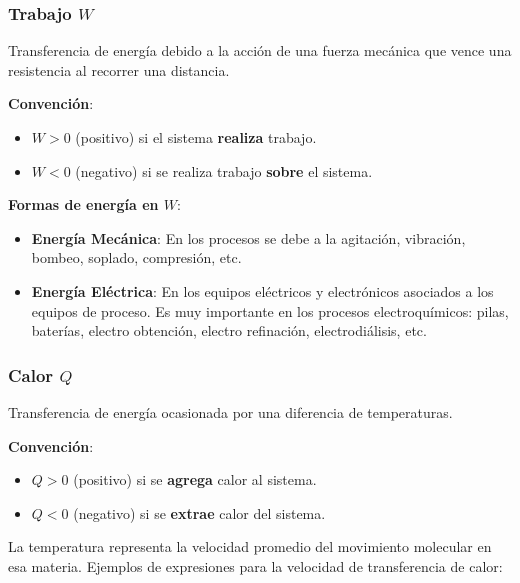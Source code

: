         \subsubsection{Trabajo \(W\)}
        
        Transferencia de energía debido a la acción de una fuerza mecánica que vence una resistencia al recorrer una distancia.
        
        \textbf{Convención}:
        
        \begin{itemize}
            \item \(W > 0\) (positivo) si el sistema \textbf{realiza} trabajo.
            \item \(W < 0\) (negativo) si se realiza trabajo \textbf{sobre} el sistema.
        \end{itemize}
        
        \textbf{Formas de energía en \(W\)}:
        
        \begin{itemize}
            \item \textbf{Energía Mecánica}: En los procesos se debe a la agitación, vibración, bombeo, soplado, compresión, etc.
            \item \textbf{Energía Eléctrica}: En los equipos eléctricos y electrónicos asociados a los equipos de proceso. Es muy importante en los procesos electroquímicos: pilas, baterías, electro obtención, electro refinación, electrodiálisis, etc.
        \end{itemize}
        
        \subsubsection{Calor \(Q\)}
        
        Transferencia de energía ocasionada por una diferencia de temperaturas.
        
        \textbf{Convención}:
        
        \begin{itemize}
            \item \(Q > 0\) (positivo) si se \textbf{agrega} calor al sistema.
            \item \(Q < 0\) (negativo) si se \textbf{extrae} calor del sistema.
        \end{itemize}
        
        La temperatura representa la velocidad promedio del movimiento molecular en esa materia. Ejemplos de expresiones para la velocidad de transferencia de calor:
        
